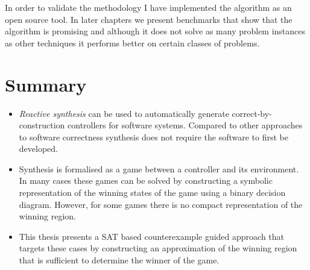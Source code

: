 In order to validate the methodology I have implemented the algorithm as an open source tool. In later chapters we present benchmarks that show that the algorithm is promising and although it does not solve as many problem instances as other techniques it performs better on certain classes of problems.


\section{Summary}

\begin{itemize}

    \item \emph{Reactive synthesis} can be used to automatically generate correct-by-construction controllers for software systems. Compared to other approaches to software correctness synthesis does not require the software to first be developed.

    \item Synthesis is formalised as a game between a controller and its environment. In many cases these games can be solved by constructing a symbolic representation of the winning states of the game using a binary decision diagram. However, for some games there is no compact representation of the winning region.

    \item This thesis presents a SAT based counterexample guided approach that targets these cases by constructing an approximation of the winning region that is sufficient to determine the winner of the game.

\end{itemize}




